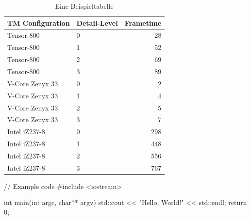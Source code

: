 \begin{table}[!htbp] %
    \centering
    \begin{tabular}{|l|l|r|}
        \hline
        \textbf{TM Configuration}   &   \textbf{Detail-Level}   &   \textbf{Frametime}\\
        \hline
        \hline
        Tensor-800                  &   0                       &   28\\
        Tensor-800                  &   1                       &   52\\
        Tensor-800                  &   2                       &   69\\
        Tensor-800                  &   3                       &   89\\
        \hdashline
        V-Core Zenyx 33             &   0                       &   2\\
        V-Core Zenyx 33             &   1                       &   4\\
        V-Core Zenyx 33             &   2                       &   5\\
        V-Core Zenyx 33             &   3                       &   7\\
        \hdashline
        Intel iZ237-8               &   0                       &   298\\
        Intel iZ237-8               &   1                       &   448\\
        Intel iZ237-8               &   2                       &   556\\
        Intel iZ237-8               &   3                       &   767\\
        \hline
    \end{tabular}
    \caption{Eine Beispieltabelle}
    \label{tbl:renderzeiten_tm_processors}
\end{table}

\begin{code}
// Example code
#include <iostream>

int main(int argc, char** argv)
{
    std::cout << "Hello, World!" << std::endl;
    return 0;
}
\end{code}
